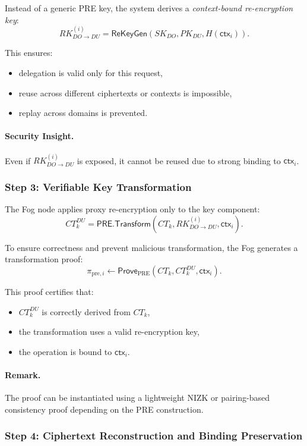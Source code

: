 \documentclass[conference]{IEEEtran}
\begin{document}
Instead of a generic PRE key, the system derives a \emph{context-bound re-encryption key}:
\[
RK_{DO \rightarrow DU}^{(i)} = \textsf{ReKeyGen}(SK_{DO}, PK_{DU}, H(\mathsf{ctx}_i)).
\]

This ensures:
\begin{itemize}
    \item delegation is valid only for this request,
    \item reuse across different ciphertexts or contexts is impossible,
    \item replay across domains is prevented.
\end{itemize}

\paragraph{Security Insight.}
Even if $RK_{DO \rightarrow DU}^{(i)}$ is exposed, it cannot be reused due to strong binding to $\mathsf{ctx}_i$.

\subsubsection*{Step 3: Verifiable Key Transformation}

The Fog node applies proxy re-encryption only to the key component:
\[
CT_k^{DU} = \textsf{PRE.Transform}(CT_k, RK_{DO \rightarrow DU}^{(i)}, \mathsf{ctx}_i).
\]

To ensure correctness and prevent malicious transformation, the Fog generates a transformation proof:
\[
\pi_{\text{pre},i} \leftarrow \textsf{Prove}_{\text{PRE}}(CT_k, CT_k^{DU}, \mathsf{ctx}_i).
\]

This proof certifies that:
\begin{itemize}
    \item $CT_k^{DU}$ is correctly derived from $CT_k$,
    \item the transformation uses a valid re-encryption key,
    \item the operation is bound to $\mathsf{ctx}_i$.
\end{itemize}

\paragraph{Remark.}
The proof can be instantiated using a lightweight NIZK or pairing-based consistency proof depending on the PRE construction.

\subsubsection*{Step 4: Ciphertext Reconstruction and Binding Preservation}
\end{document}
